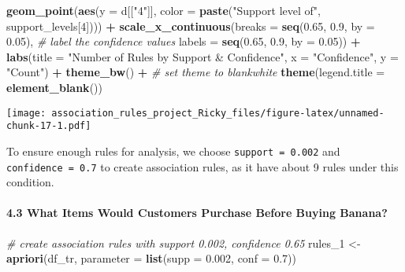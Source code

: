 \documentclass[]{article}
\newenvironment{Shaded}{\begin{snugshade}}{\end{snugshade}}
\newcommand{\CommentTok}[1]{\textcolor[rgb]{0.56,0.35,0.01}{\textit{#1}}}
\newcommand{\DataTypeTok}[1]{\textcolor[rgb]{0.13,0.29,0.53}{#1}}
\newcommand{\DecValTok}[1]{\textcolor[rgb]{0.00,0.00,0.81}{#1}}
\newcommand{\FloatTok}[1]{\textcolor[rgb]{0.00,0.00,0.81}{#1}}
\newcommand{\KeywordTok}[1]{\textcolor[rgb]{0.13,0.29,0.53}{\textbf{#1}}}
\newcommand{\NormalTok}[1]{#1}
\newcommand{\OperatorTok}[1]{\textcolor[rgb]{0.81,0.36,0.00}{\textbf{#1}}}
\newcommand{\StringTok}[1]{\textcolor[rgb]{0.31,0.60,0.02}{#1}}
\let\oldparagraph\paragraph
\renewcommand{\paragraph}[1]{\oldparagraph{#1}\mbox{}}
\begin{document}
\begin{Shaded}
\begin{Highlighting}[]
\StringTok{  }\KeywordTok{geom_point}\NormalTok{(}\KeywordTok{aes}\NormalTok{(}\DataTypeTok{y =}\NormalTok{ d[[}\StringTok{"4"}\NormalTok{]], }\DataTypeTok{color =} \KeywordTok{paste}\NormalTok{(}\StringTok{"Support level of"}\NormalTok{, support_levels[}\DecValTok{4}\NormalTok{]))) }\OperatorTok{+}
\StringTok{  }
\StringTok{  }\KeywordTok{scale_x_continuous}\NormalTok{(}\DataTypeTok{breaks =} \KeywordTok{seq}\NormalTok{(}\FloatTok{0.65}\NormalTok{, }\FloatTok{0.9}\NormalTok{, }\DataTypeTok{by =} \FloatTok{0.05}\NormalTok{), }\CommentTok{# label the confidence values}
                     \DataTypeTok{labels =} \KeywordTok{seq}\NormalTok{(}\FloatTok{0.65}\NormalTok{, }\FloatTok{0.9}\NormalTok{, }\DataTypeTok{by =} \FloatTok{0.05}\NormalTok{)) }\OperatorTok{+}
\StringTok{  }
\StringTok{  }\KeywordTok{labs}\NormalTok{(}\DataTypeTok{title =} \StringTok{"Number of Rules by Support & Confidence"}\NormalTok{,}
       \DataTypeTok{x =} \StringTok{"Confidence"}\NormalTok{, }\DataTypeTok{y =} \StringTok{"Count"}\NormalTok{) }\OperatorTok{+}
\StringTok{  }
\StringTok{  }\KeywordTok{theme_bw}\NormalTok{() }\OperatorTok{+}\StringTok{ }\CommentTok{# set theme to blankwhite}
\StringTok{  }\KeywordTok{theme}\NormalTok{(}\DataTypeTok{legend.title =} \KeywordTok{element_blank}\NormalTok{())}
\end{Highlighting}
\end{Shaded}

\texttt{[image: association\_rules\_project\_Ricky\_files/figure-latex/unnamed-chunk-17-1.pdf]}

To ensure enough rules for analysis, we choose
\texttt{support\ =\ 0.002} and \texttt{confidence\ =\ 0.7} to create
association rules, as it have about 9 rules under this condition.

\hypertarget{what-items-would-customers-purchase-before-buying-banana}{%
\paragraph{4.3 What Items Would Customers Purchase Before Buying
Banana?}\label{what-items-would-customers-purchase-before-buying-banana}}

\begin{Shaded}
\begin{Highlighting}[]
\CommentTok{# create association rules with support 0.002, confidence 0.65}
\NormalTok{rules_}\DecValTok{1}\NormalTok{ <-}\StringTok{ }\KeywordTok{apriori}\NormalTok{(df_tr, }\DataTypeTok{parameter =} \KeywordTok{list}\NormalTok{(}\DataTypeTok{supp =} \FloatTok{0.002}\NormalTok{, }\DataTypeTok{conf =} \FloatTok{0.7}\NormalTok{))}
\end{Highlighting}
\end{Shaded}
\end{document}
